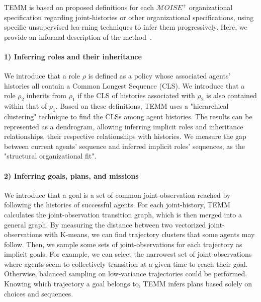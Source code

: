 \documentclass[pdflatex,sn-mathphys-num]{sn-jnl}%
\theoremstyle{thmstyleone}%
\theoremstyle{thmstyletwo}%
\theoremstyle{thmstylethree}%
\begin{document}
TEMM is based on proposed definitions for each $\mathcal{M}OISE^+$ organizational specification regarding joint-histories or other organizational specifications, using specific unsupervised lea-rning techniques to infer them progressively. Here, we provide an informal description of the method~\hyperref[fn:github]{\footnotemark[1]}.
%

\paragraph{1) Inferring roles and their inheritance}

We introduce that a role $\rho$ is defined as a policy whose associated agents' histories all contain a Common Longest Sequence (CLS). We introduce that a role $\rho_2$ inherits from $\rho_1$ if the CLS of histories associated with $\rho_2$ is also contained within that of $\rho_1$.
Based on these definitions, TEMM uses a "hierarchical clustering" technique to find the CLSs among agent histories. The results can be represented as a dendrogram, allowing inferring implicit roles and inheritance relationships, their respective relationships with histories.
We measure the gap between current agents' sequence and inferred implicit roles' sequences, as the "structural organizational fit".

\paragraph{2) Inferring goals, plans, and missions}

We introduce that a goal is a set of common joint-observation reached by following the histories of successful agents.
For each joint-history, TEMM calculates the joint-observation transition graph, which is then merged into a general graph. By measuring the distance between two vectorized joint-observations with K-means, we can find trajectory clusters that some agents may follow. Then, we sample some sets of joint-observations for each trajectory as implicit goals. For example, we can select the narrowest set of joint-observations where agents seem to collectively transition at a given time to reach their goal. Otherwise, balanced sampling on low-variance trajectories could be performed. Knowing which trajectory a goal belongs to, TEMM infers plans based solely on choices and sequences.
\end{document}
